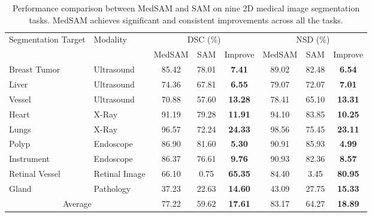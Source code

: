 \documentclass[runningheads]{llncs}
\begin{document}
\begin{table}[]
\caption{Performance comparison between MedSAM and SAM on nine 2D medical image segmentation tasks. MedSAM achieves significant and consistent improvements across all the tasks.}\label{tab:2d}
\centering
\begin{tabular}{llccc|ccc}
\hline
\multirow{2}{*}{Segmentation Target} & \multirow{2}{*}{Modality} & \multicolumn{3}{c|}{DSC (\%)}             & \multicolumn{3}{c}{NSD (\%)}              \\ \cline{3-8} 
                                     &                           & MedSAM  & SAM     & Improve     & MedSAM  & SAM     & Improve     \\ \hline
Breast Tumor                         & Ultrasound                & 85.42 & 78.01 & \textbf{7.41}  & 89.02 & 82.48 & \textbf{6.54}  \\
Liver                                & Ultrasound                & 74.36 & 67.81 & \textbf{6.55}  & 79.07 & 72.07 & \textbf{7.01}  \\
Vessel                               & Ultrasound                & 70.88 & 57.60 & \textbf{13.28} & 78.41 & 65.10 & \textbf{13.31} \\
Heart                                & X-Ray                     & 91.19 & 79.28 & \textbf{11.91} & 94.10 & 83.85 & \textbf{10.25} \\
Lungs                                & X-Ray                     & 96.57 & 72.24 & \textbf{24.33} & 98.56 & 75.45 & \textbf{23.11} \\
Polyp                                & Endoscope                 & 86.90 & 81.60 & \textbf{5.30}  & 90.91 & 85.93 & \textbf{4.99}  \\
Instrument                           & Endoscope                 & 86.37 & 76.61 & \textbf{9.76}  & 90.93 & 82.36 & \textbf{8.57}  \\
Retinal Vessel                       & Retinal Image             & 66.10 & 0.75  & \textbf{65.35} & 84.40 & 3.45  & \textbf{80.95} \\
Gland                                & Pathology                 & 37.23 & 22.63 & \textbf{14.60} & 43.09 & 27.75 & \textbf{15.33} \\ \hline
\multicolumn{2}{c}{Average}                                      & 77.22 & 59.62 & \textbf{17.61} & 83.17 & 64.27 & \textbf{18.89} \\ \hline
\end{tabular}
\end{table}
\end{document}

